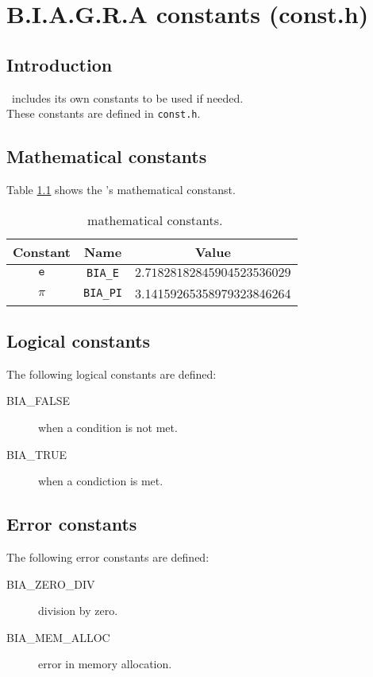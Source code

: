 %
%

\chapter{B.I.A.G.R.A constants (const.h)} \label{ch:mathematicalConsts}

\section{Introduction}

\BI \ includes its own constants to be used if needed.\\

These constants are defined in \texttt{const.h}.

\section{Mathematical constants} \label{sec:mathematicalConsts}

Table \ref{tab:mathematicalConsts} shows the \BI's mathematical constanst.

\begin{table}[!h]
  \begin{center}
  \begin{tabular}{|c|c|c|}
    \hline
    \textbf{Constant} & \textbf{Name} & \textbf{Value} \\
    \hline
    $\texttt{e}$ & \texttt{BIA\_E} & $2.71828182845904523536029$ \\
    \hline
    $\pi$ & \texttt{BIA\_PI} & 3.14159265358979323846264 \\
    \hline
  \end{tabular}
  \end{center}
\caption{\BI\ mathematical constants.} \label{tab:mathematicalConsts}
\end{table}

\FloatBarrier

\section{Logical constants}

The following logical constants are defined:

\begin{description}
\item[BIA\_FALSE] when a condition is not met.
\item[BIA\_TRUE] when a condiction is met.
\end{description}

\section{Error constants}

The following error constants are defined:

\begin{description}
\item[BIA\_ZERO\_DIV] division by zero.
\item[BIA\_MEM\_ALLOC] error in memory allocation.
\end{description}
